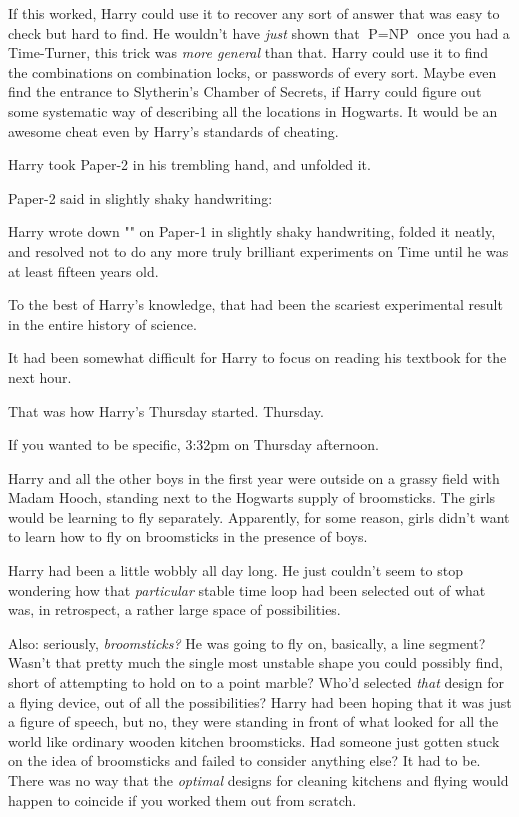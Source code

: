 If this worked, Harry could use it to recover any sort of answer that was easy 
to check but hard to find. He wouldn't have \emph{just} shown that $\mbox{P}=\mbox{NP}$ once 
you had a Time-Turner, this trick was \emph{more general} than that. Harry 
could use it to find the combinations on combination locks, or passwords of 
every sort. Maybe even find the entrance to Slytherin's Chamber of Secrets, if 
Harry could figure out some systematic way of describing all the locations in 
Hogwarts. It would be an awesome cheat even by Harry's standards of cheating.

Harry took Paper-{2} in his trembling hand, and unfolded it.

Paper-{2} said in slightly shaky handwriting:


Harry wrote down "" on Paper-{1} in slightly shaky 
handwriting, folded it neatly, and resolved not to do any more truly brilliant 
experiments on Time until he was at least fifteen years old.

To the best of Harry's knowledge, that had been the scariest experimental 
result in the entire history of science.

It had been somewhat difficult for Harry to focus on reading his textbook for 
the next hour.

That was how Harry's Thursday started.
\sbreak
Thursday.

If you wanted to be specific, 3:32pm on Thursday afternoon.

Harry and all the other boys in the first year were outside on a grassy field 
with Madam Hooch, standing next to the Hogwarts supply of broomsticks. The 
girls would be learning to fly separately. Apparently, for some reason, girls 
didn't want to learn how to fly on broomsticks in the presence of boys.

Harry had been a little wobbly all day long. He just couldn't seem to stop 
wondering how that \emph{particular} stable time loop had been selected out of 
what was, in retrospect, a rather large space of possibilities.

Also: seriously, \emph{broomsticks?} He was going to fly on, basically, a line 
segment? Wasn't that pretty much the single most unstable shape you could 
possibly find, short of attempting to hold on to a point marble? Who'd selected 
\emph{that} design for a flying device, out of all the possibilities? Harry had 
been hoping that it was just a figure of speech, but no, they were standing in 
front of what looked for all the world like ordinary wooden kitchen 
broomsticks. Had someone just gotten stuck on the idea of broomsticks and 
failed to consider anything else? It had to be. There was no way that the 
\emph{optimal} designs for cleaning kitchens and flying would happen to 
coincide if you worked them out from scratch.

